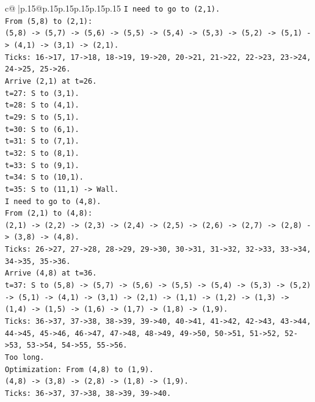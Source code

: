 \documentclass{article}
\begin{document}
{\begin{supertabular}{c@{$\;$}|p{.15\linewidth}@{}p{.15\linewidth}p{.15\linewidth}p{.15\linewidth}p{.15\linewidth}p{.15\linewidth}}
{{{\texttt{I need to go to (2,1).} \\
\texttt{From (5,8) to (2,1):} \\
\texttt{(5,8) {-}> (5,7) {-}> (5,6) {-}> (5,5) {-}> (5,4) {-}> (5,3) {-}> (5,2) {-}> (5,1) {-}> (4,1) {-}> (3,1) {-}> (2,1).} \\
\texttt{Ticks: 16{-}>17, 17{-}>18, 18{-}>19, 19{-}>20, 20{-}>21, 21{-}>22, 22{-}>23, 23{-}>24, 24{-}>25, 25{-}>26.} \\
\texttt{Arrive (2,1) at t=26.} \\
\texttt{t=27: S to (3,1).} \\
\texttt{t=28: S to (4,1).} \\
\texttt{t=29: S to (5,1).} \\
\texttt{t=30: S to (6,1).} \\
\texttt{t=31: S to (7,1).} \\
\texttt{t=32: S to (8,1).} \\
\texttt{t=33: S to (9,1).} \\
\texttt{t=34: S to (10,1).} \\
\texttt{t=35: S to (11,1) {-}> Wall.} \\
\texttt{I need to go to (4,8).} \\
\texttt{From (2,1) to (4,8):} \\
\texttt{(2,1) {-}> (2,2) {-}> (2,3) {-}> (2,4) {-}> (2,5) {-}> (2,6) {-}> (2,7) {-}> (2,8) {-}> (3,8) {-}> (4,8).} \\
\texttt{Ticks: 26{-}>27, 27{-}>28, 28{-}>29, 29{-}>30, 30{-}>31, 31{-}>32, 32{-}>33, 33{-}>34, 34{-}>35, 35{-}>36.} \\
\texttt{Arrive (4,8) at t=36.} \\
\texttt{t=37: S to (5,8) {-}> (5,7) {-}> (5,6) {-}> (5,5) {-}> (5,4) {-}> (5,3) {-}> (5,2) {-}> (5,1) {-}> (4,1) {-}> (3,1) {-}> (2,1) {-}> (1,1) {-}> (1,2) {-}> (1,3) {-}> (1,4) {-}> (1,5) {-}> (1,6) {-}> (1,7) {-}> (1,8) {-}> (1,9).} \\
\texttt{Ticks: 36{-}>37, 37{-}>38, 38{-}>39, 39{-}>40, 40{-}>41, 41{-}>42, 42{-}>43, 43{-}>44, 44{-}>45, 45{-}>46, 46{-}>47, 47{-}>48, 48{-}>49, 49{-}>50, 50{-}>51, 51{-}>52, 52{-}>53, 53{-}>54, 54{-}>55, 55{-}>56.} \\
\texttt{Too long.} \\
\texttt{Optimization: From (4,8) to (1,9).} \\
\texttt{(4,8) {-}> (3,8) {-}> (2,8) {-}> (1,8) {-}> (1,9).} \\
\texttt{Ticks: 36{-}>37, 37{-}>38, 38{-}>39, 39{-}>40.} \\
}}}
\end{supertabular}}
\end{document}
